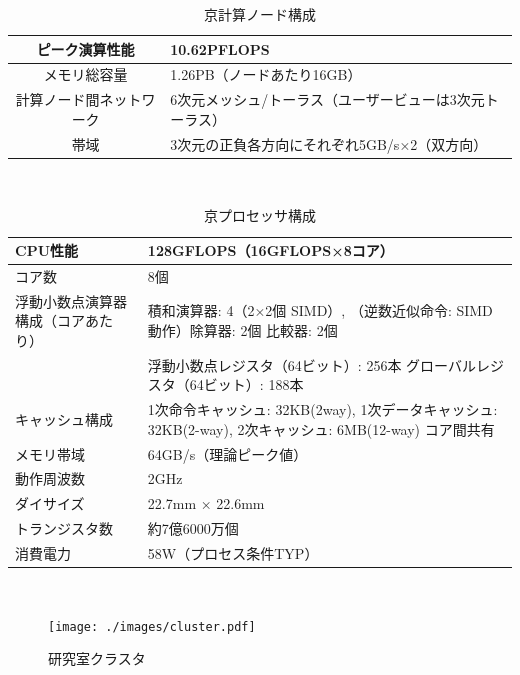 \begin{table}[htb]
  \begin{center}
    \begin{tabular}{|c|p{12cm}|}
      \hline
      ピーク演算性能 & 10.62PFLOPS \\ \hline
      メモリ総容量 & 1.26PB（ノードあたり16GB）\\ \hline
      計算ノード間ネットワーク & 6次元メッシュ/トーラス（ユーザービューは3次元トーラス）\\ \hline
      帯域 & 3次元の正負各方向にそれぞれ5GB/s×2（双方向）\\ \hline
    \end{tabular}
    \caption{京計算ノード構成}
    \label{table:k}
  \end{center}
\end{table}~\\
\begin{table}[ht]
  \begin{center}
    \begin{tabular}{|l|l|}
      \hline
      CPU性能 & 128GFLOPS（16GFLOPS×8コア）\\ \hline
      コア数 & 8個\\ \hline
      浮動小数点演算器構成（コアあたり）& 積和演算器: 4（2×2個 SIMD）, （逆数近似命令: SIMD 動作）除算器: 2個 比較器: 2個\\ \cline{1-2}
      & 浮動小数点レジスタ（64ビット）: 256本 グローバルレジスタ（64ビット）: 188本\\ \cline{1-2}
      キャッシュ構成 & 1次命令キャッシュ: 32KB(2way), 1次データキャッシュ: 32KB(2-way), 2次キャッシュ: 6MB(12-way) コア間共有\\ \hline
      メモリ帯域 & 64GB/s（理論ピーク値）\\ \hline
      動作周波数 & 2GHz \\ \hline
      ダイサイズ & 22.7mm × 22.6mm \\ \hline
      トランジスタ数 & 約7億6000万個 \\ \hline
      消費電力 & 58W（プロセス条件TYP）\\ \hline
    \end{tabular}
    \caption{京プロセッサ構成}
    \label{table:k-processor}
  \end{center}
\end{table}~\\
\vspace{-1cm}
\begin{figure}[htb]
  \begin{center}
    \texttt{[image: ./images/cluster.pdf]}
    \caption{研究室クラスタ}
    \label{fig:cluster}
  \end{center}
\end{figure}~\\
